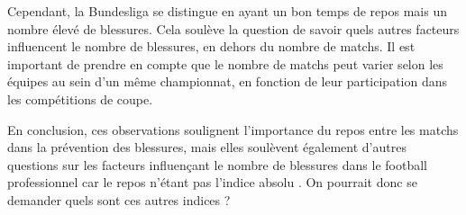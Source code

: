 \documentclass[
]{article}
\begin{document}
Cependant, la Bundesliga se distingue en ayant un bon temps de repos
mais un nombre élevé de blessures. Cela soulève la question de savoir
quels autres facteurs influencent le nombre de blessures, en dehors du
nombre de matchs. Il est important de prendre en compte que le nombre de
matchs peut varier selon les équipes au sein d'un même championnat, en
fonction de leur participation dans les compétitions de coupe.

En conclusion, ces observations soulignent l'importance du repos entre
les matchs dans la prévention des blessures, mais elles soulèvent
également d'autres questions sur les facteurs influençant le nombre de
blessures dans le football professionnel car le repos n'étant pas
l'indice absolu . On pourrait donc se demander quels sont ces autres
indices ?
\end{document}
